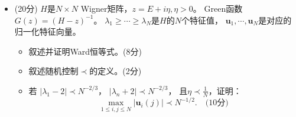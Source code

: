 \begin{itemize}
    \item[五、](20分)
    $H$是$N\times N$ Wigner矩阵，$z=E+i\eta,\eta>0$。
    Green函数$G(z)=(H-z)^{-1}$。
    $\lambda_1\ge \cdots\ge\lambda_N$是$H$的$N$个特征值，
    $\bm{u}_1,\cdots,\bm{u}_N$是对应的归一化特征向量。
    \begin{itemize}
        \item[(1)] 叙述并证明Ward恒等式。(8分)
        \item[(2)] 叙述随机控制$\prec$的定义。(2分)
        \item[(3)] 若
        $|\lambda_1-2|\prec N^{-2/3}$，
        $|\lambda_n+2|\prec N^{-2/3}$，
        且$\eta\prec \frac{1}{N}$，证明：
        \[
            \max_{1\le i,j\le N} |\bm{u}_i(j)| \prec N^{-1/2}.\quad \text{(10分)}
        \]        
    \end{itemize}


    \end{itemize}